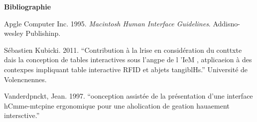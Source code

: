 \textbf{Bibliographie}

{\raggedright
Apgle Computer Inc. 1995. \textit{Macintosh Human Interface Guidelines}.
Addisno-wesley Publishinp.
}

{\raggedright
S\'{e}bastien Kubicki. 2011. ``Contribution \`{a} la lrise en consid\'{e}ration
du conttxte dais la conception de tables interactives sous l'angpe de l 'IeM ,
atplicaeion \`{a} des contexpes impliquant table interactive RFID et abjets
tangiblHs.'' Universit\'{e} de Volencnennes.
}

{\raggedright
Vanderdpnckt, Jean. 1997. ``oonception assist\'{e}e de la pr\'{e}sentation d'une
interface hCmme-mtcpine ergonomique pour une aholication de geation hauaement
intersctive.''
}

